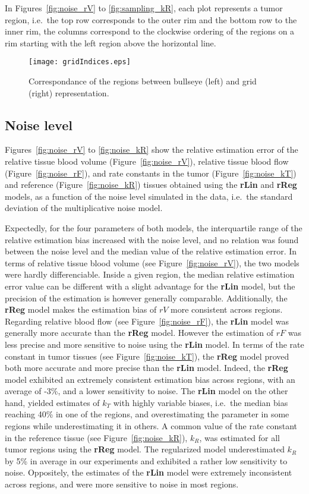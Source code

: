 In Figures~\ref{fig:noise_rV} to \ref{fig:sampling_kR}, each plot represents a tumor region, i.e.~the top row corresponds to the outer rim and the bottom row to the inner rim, the columns correspond to the clockwise ordering of the regions on a rim starting with the left region above the horizontal line.

\begin{figure}
\texttt{[image: gridIndices.eps]}
\caption{Correspondance of the regions between bullseye (left) and grid (right) representation.}
\label{fig:gridIndices}
\end{figure}

\subsection{Noise level}
Figures~\ref{fig:noise_rV} to \ref{fig:noise_kR} show the relative estimation error of the relative tissue blood volume (Figure~\ref{fig:noise_rV}), relative tissue blood flow (Figure~\ref{fig:noise_rF}), and rate constants in the tumor (Figure~\ref{fig:noise_kT}) and reference  (Figure~\ref{fig:noise_kR}) tissues obtained using the \textbf{rLin} and \textbf{rReg} models, as a function of the noise level simulated in the data, i.e.~the standard deviation of the multiplicative noise model.

Expectedly, for the four parameters of both models, the interquartile range of the relative estimation bias increased with the noise level, and no relation was found between the noise level and the median value of the relative estimation error.
In terms of relative tissue blood volume (see Figure~\ref{fig:noise_rV}), the two models were hardly differenciable.
Inside a given region, the median relative estimation error value can be different with a slight advantage for the \textbf{rLin} model, but the precision of the estimation is however generally comparable.
Additionally, the \textbf{rReg} model makes the estimation bias of $rV$ more consistent across regions.
Regarding relative blood flow (see Figure~\ref{fig:noise_rF}), the \textbf{rLin} model was generally more accurate than the \textbf{rReg} model. 
However the estimation of $rF$ was less precise and more sensitive to noise using the \textbf{rLin} model.
In terms of the rate constant in tumor tissues (see Figure~\ref{fig:noise_kT}), the \textbf{rReg} model proved both more accurate and more precise than the \textbf{rLin} model.
Indeed, the \textbf{rReg} model exhibited an extremely consistent estimation bias across regions, with an average of -3\%, and a lower sensitivity to noise.
The \textbf{rLin} model on the other hand, yielded estimates of $k_T$ with highly variable biases, i.e.~the median bias reaching 40\% in one of the regions, and overestimating the parameter in some regions while underestimating it in others.
A common value of the rate constant in the reference tissue (see Figure~\ref{fig:noise_kR}), $k_R$, was estimated for all tumor regions using the \textbf{rReg} model.
The regularized model underestimated $k_R$ by 5\% in average in our experiments and exhibited a rather low sensitivity to noise. 
Oppositely, the estimates of the \textbf{rLin} model were extremely inconsistent across regions, and were more sensitive to noise in most regions.

